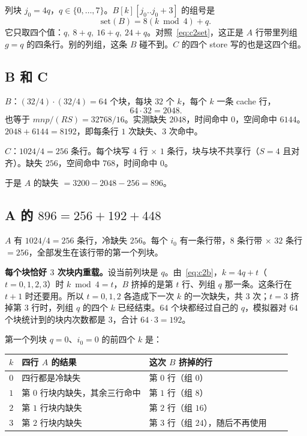 列块 $j_0=4q$，$q\in\{0,\ldots,7\}$。$B[k][j_0..j_0+3]$ 的组号是
\begin{equation}
\label{eq:c2b}
\mathrm{set}(B)=8(k\bmod 4)+q.
\end{equation}
它只取四个值：$q,\ 8+q,\ 16+q,\ 24+q$。对照~\eqref{eq:c2set}，这正是 $A$ 行带里列组 $g=q$ 的四条行。别的列组，这条 $B$ 碰不到。$C$ 的四个 store 写的也是这四个组。

\subsection{B 和 C}

$B$：$(32/4)\cdot(32/4)=64$ 个块，每块 $32$ 个 $k$，每个 $k$ 一条 cache 行，
\[
64\cdot32=2048.
\]
也等于 $mnp/(RS)=32768/16$。实测缺失 $2048$，时间命中 $0$，空间命中 $6144$。$2048+6144=8192$，即每条行 $1$ 次缺失、$3$ 次命中。

$C$：$1024/4=256$ 条行。每个块写 $4$ 行 $\times$ $1$ 条行，块与块不共享行（$S=4$ 且对齐）。缺失 $256$，空间命中 $768$，时间命中 $0$。

于是 $A$ 的缺失 $=3200-2048-256=896$。

\subsection{A 的 \texorpdfstring{$896=256+192+448$}{896}}

$A$ 有 $1024/4=256$ 条行，冷缺失 $256$。每个 $i_0$ 有一条行带，$8$ 条行带 $\times$ $32$ 条行 $=256$，全部发生在该行带的第一个列块。

\textbf{每个块恰好 $3$ 次块内重载。}设当前列块是 $q$。由~\eqref{eq:c2b}，$k=4q+t$（$t=0,1,2,3$）时 $k\bmod 4=t$，$B$ 挤掉的是第 $t$ 行、列组 $q$ 那一条。这条行在 $t+1$ 时还要用。所以 $t=0,1,2$ 各造成下一次 $k$ 的一次缺失，共 $3$ 次；$t=3$ 挤掉第 $3$ 行时，列组 $q$ 的四个 $k$ 已经结束。$64$ 个块都经过自己的 $q$，模拟器对 $64$ 个块统计到的块内次数都是 $3$，合计 $64\cdot3=192$。

第一个列块 $q=0$、$i_0=0$ 的前四个 $k$ 是：

\begin{center}
\small
\begin{tabular}{@{}rllll@{}}
\toprule
$k$ & 四行 $A$ 的结果 & 这次 $B$ 挤掉的行\\
\midrule
$0$ & 四行都是冷缺失 & 第 $0$ 行（组 $0$）\\
$1$ & 第 $0$ 行块内缺失，其余三行命中 & 第 $1$ 行（组 $8$）\\
$2$ & 第 $1$ 行块内缺失 & 第 $2$ 行（组 $16$）\\
$3$ & 第 $2$ 行块内缺失 & 第 $3$ 行（组 $24$），随后不再使用\\
\bottomrule
\end{tabular}
\end{center}

